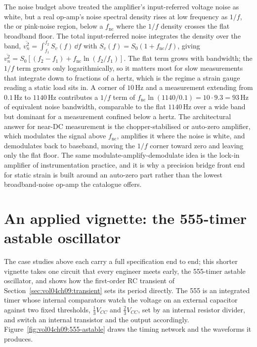 \begin{mastery}
The noise budget above treated the amplifier's input-referred voltage
noise as white, but a real op-amp's noise spectral density rises at low
frequency as $1/f$, the  or pink-noise region, below a
 $f_{\text{nc}}$ where the $1/f$ density crosses
the flat broadband floor. The total input-referred noise integrates the
density over the band, $\overline{v_n^2} = \int_{f_1}^{f_2} S_v(f)\,\dd f$
with $S_v(f) = S_0(1 + f_{\text{nc}}/f)$, giving $\overline{v_n^2} =
S_0[(f_2 - f_1) + f_{\text{nc}}\ln(f_2/f_1)]$. The flat term grows with
bandwidth; the $1/f$ term grows only logarithmically, so it matters most
for slow measurements that integrate down to fractions of a hertz, which
is the regime a strain gauge reading a static load sits in. A corner of
$10\,\si{\hertz}$ and a measurement extending from $0.1\,\si{\hertz}$ to
$1140\,\si{\hertz}$ contributes a $1/f$ term of $f_{\text{nc}}\ln(1140/0.1)
= 10\cdot 9.3 = 93\,\si{\hertz}$ of equivalent noise bandwidth, comparable
to the flat $1140\,\si{\hertz}$ over a wide band but dominant for a
measurement confined below a hertz. The architectural answer for
near-DC measurement is the chopper-stabilised or auto-zero amplifier,
which modulates the signal above $f_{\text{nc}}$, amplifies it where the
noise is white, and demodulates back to baseband, moving the
$1/f$ corner toward zero and leaving only the flat floor. The same
modulate-amplify-demodulate idea is the lock-in amplifier of
instrumentation practice, and it is why a precision bridge front end for
static strain is built around an auto-zero part rather than the lowest
broadband-noise op-amp the catalogue offers.
\end{mastery}

\section{An applied vignette: the 555-timer astable oscillator}
\label{sec:vol04ch09:555}

The case studies above each carry a full specification end to end; this
shorter vignette takes one circuit that every engineer meets early, the
555-timer astable oscillator, and shows how the first-order RC transient
of Section~\ref{sec:vol04ch09:transient} sets its period directly. The 555
is an integrated timer whose internal comparators watch the voltage on an
external capacitor against two fixed thresholds, $\tfrac{1}{3}V_{CC}$ and
$\tfrac{2}{3}V_{CC}$, set by an internal resistor divider, and switch an
internal transistor and the output accordingly.
Figure~\ref{fig:vol04ch09:555-astable} draws the timing network and the
waveforms it produces.

